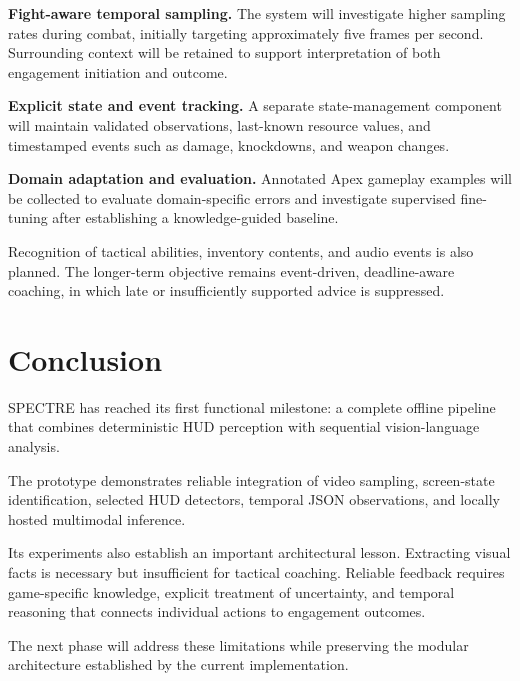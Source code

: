 \documentclass[10pt,letterpaper]{article}
\begin{document}
\textbf{Fight-aware temporal sampling.}
The system will investigate higher sampling rates
during combat, initially targeting approximately
five frames per second. Surrounding context will
be retained to support interpretation of both
engagement initiation and outcome.

\textbf{Explicit state and event tracking.}
A separate state-management component will maintain
validated observations, last-known resource values,
and timestamped events such as damage, knockdowns,
and weapon changes.

\textbf{Domain adaptation and evaluation.}
Annotated Apex gameplay examples will be collected
to evaluate domain-specific errors and investigate
supervised fine-tuning after establishing a
knowledge-guided baseline.

Recognition of tactical abilities, inventory
contents, and audio events is also planned.
The longer-term objective remains event-driven,
deadline-aware coaching, in which late or
insufficiently supported advice is suppressed.

\section{Conclusion}

SPECTRE has reached its first functional milestone:
a complete offline pipeline that combines deterministic
HUD perception with sequential vision-language analysis.

The prototype demonstrates reliable integration of
video sampling, screen-state identification, selected
HUD detectors, temporal JSON observations, and
locally hosted multimodal inference.

Its experiments also establish an important architectural
lesson. Extracting visual facts is necessary but
insufficient for tactical coaching. Reliable feedback
requires game-specific knowledge, explicit treatment of
uncertainty, and temporal reasoning that connects
individual actions to engagement outcomes.

The next phase will address these limitations while
preserving the modular architecture established by
the current implementation.
\end{document}

